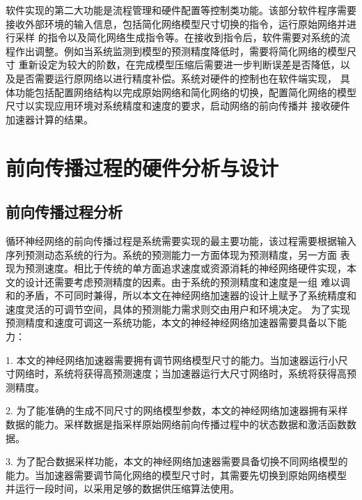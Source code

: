 软件实现的第二大功能是流程管理和硬件配置等控制类功能。该部分软件程序需要接收外部环境的输入信息，包括简化网络模型尺寸切换的指令，运行原始网络并进行采样
的指令以及简化网络生成指令等。在接收到指令后，软件需要对系统的流程作出调整。例如当系统监测到模型的预测精度降低时，需要将简化网络的模型尺寸
重新设定为较大的阶数，在完成模型压缩后需要进一步判断误差是否降低，以及是否需要运行原网络以进行精度补偿。系统对硬件的控制也在软件端实现，
具体功能包括配置网络结构以完成原始网络和简化网络的切换，配置简化网络的模型尺寸以实现应用环境对系统精度和速度的要求，启动网络的前向传播并
接收硬件加速器计算的结果。

\section{前向传播过程的硬件分析与设计}
\subsection{前向传播过程分析}
循环神经网络的前向传播过程是系统需要实现的最主要功能，该过程需要根据输入序列预测动态系统的行为。系统的预测能力一方面体现为预测精度，另一方面
表现为预测速度。相比于传统的单方面追求速度或资源消耗的神经网络硬件实现，本文的设计还需要考虑预测精度的因素。由于系统的预测精度和速度是一组
难以调和的矛盾，不可同时兼得，所以本文在神经网络加速器的设计上赋予了系统精度和速度灵活的可调节空间，具体的预测能力需求则交由用户和环境决定。
为了实现预测精度和速度可调这一系统功能，本文的神经神经网络加速器需要具备以下能力：

1. 本文的神经网络加速器需要拥有调节网络模型尺寸的能力。当加速器运行小尺寸网络时，系统将获得高预测速度；当加速器运行大尺寸网络时，系统将获得高预测精度。

2. 为了能准确的生成不同尺寸的网络模型参数，本文的神经网络加速器拥有采样数据的能力。采样数据是指采样原始网络前向传播过程中的状态数据和激活函数数据。

3. 为了配合数据采样功能，本文的神经网络加速器需要具备切换不同网络模型的能力。当加速器需要调节简化网络的模型尺寸时，其需要先切换到原始网络模型
并运行一段时间，以采用足够的数据供压缩算法使用。 

